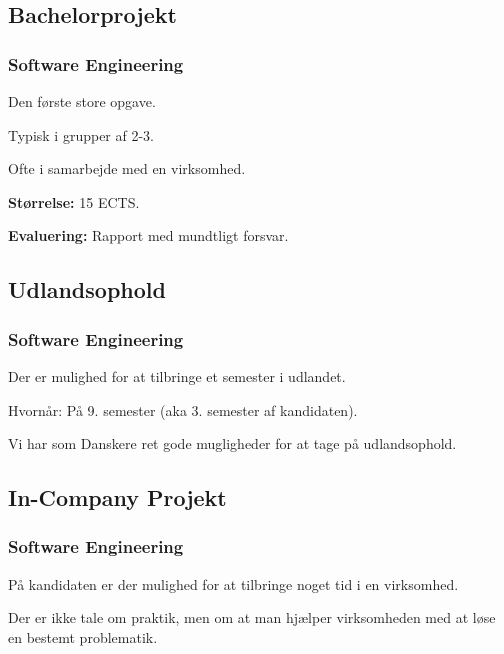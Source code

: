 {\subsection{Bachelorprojekt}
\begin{frame}[fragile]
  \frametitle{Software Engineering }
  \vspace{3mm}
  Den første store opgave.
  
  \pause
  \vspace{5mm}
  Typisk i grupper af 2-3.
  
  \pause
  \vspace{5mm}
  Ofte i samarbejde med en virksomhed.
  
  \pause
  \vspace{5mm}
  \textbf{Størrelse:} 15 ECTS.
  
  \pause
  \vspace{5mm}
  \textbf{Evaluering:} Rapport med mundtligt forsvar.
\end{frame}

\subsection{Udlandsophold}
\begin{frame}[fragile]
  \frametitle{Software Engineering }
  \vspace{3mm}
  Der er mulighed for at tilbringe et semester i udlandet.
  
  \pause
  \vspace{5mm}
  Hvornår: På 9. semester \pause (aka 3. semester af kandidaten).
  
  \pause
  \vspace{5mm}
  Vi har som Danskere ret gode mugligheder for at tage på udlandsophold.
\end{frame}

\subsection{In-Company Projekt}
\begin{frame}[fragile]
  \frametitle{Software Engineering }
  \vspace{3mm}
  På kandidaten er der mulighed for at tilbringe noget tid i en virksomhed.
  
  \pause
  \vspace{5mm}
  Der er ikke tale om praktik, men om at man hjælper virksomheden med at løse en bestemt problematik.
  

\end{frame}}
